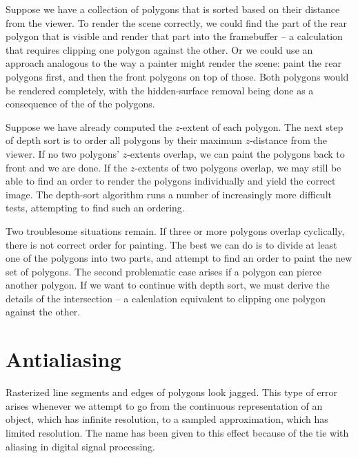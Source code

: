 \documentclass[../COS3712_Notes.tex]{subfiles}
\begin{document}
        Suppose we have a collection of polygons that is sorted based on their distance
        from the viewer.
        To render the scene correctly, we could find the part of the rear polygon
        that is visible and render that part into the framebuffer
        -- a calculation that requires clipping one polygon against the other.
        Or we could use an approach analogous to the way a painter might render the scene:
        paint the rear polygons first, and then the front polygons on top of those.
        Both polygons would be rendered completely, with the hidden-surface removal
        being done as a consequence of the  of the polygons.

        Suppose we have already computed the $z$-extent of each polygon.
        The next step of depth sort is to order all polygons by their maximum $z$-distance
        from the viewer.
        If no two polygons' $z$-extents overlap, we can paint the polygons back to front and we
        are done.
        If the $z$-extents of two polygons overlap, we may still be able to find an order to
        render the polygons individually and yield the correct image.
        The depth-sort algorithm runs a number of increasingly more difficult tests,
        attempting to find such an ordering.

        Two troublesome situations remain.
        If three or more polygons overlap cyclically, there is not correct order for painting.
        The best we can do is to divide at least one of the polygons into two parts,
        and attempt to find an order to paint the new set of polygons.
        The second problematic case arises if a polygon can pierce another polygon.
        If we want to continue with depth sort, we must derive the details of the intersection
        -- a calculation equivalent to clipping one polygon against the other.

    \section{Antialiasing}
      Rasterized line segments and edges of polygons look jagged.
      This type of error arises whenever we attempt to go from the continuous representation
      of an object, which has infinite resolution, to a sampled approximation,
      which has limited resolution.
      The name  has been given to this effect because of the tie
      with aliasing in digital signal processing.
\end{document}

